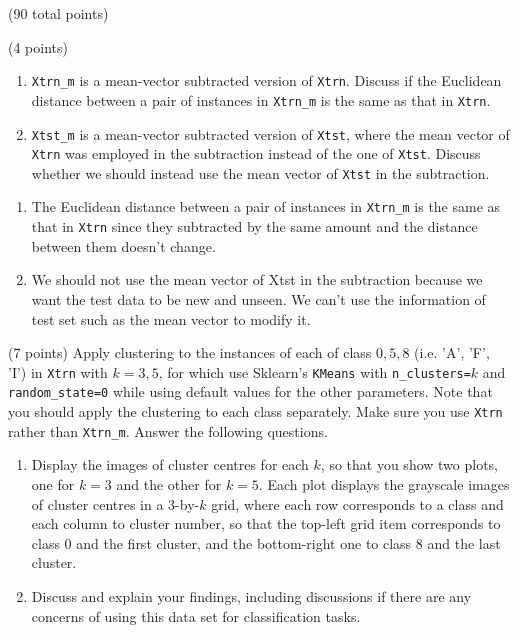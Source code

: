 \documentclass[12pt]{article}
\begin{document}
\begin{question}{(90 total points) \qTwoTitle}
\begin{subquestion}{(4 points)
  } \label{q2.2}
  \begin{enumerate}\NARROWITEM
  \item {\tt Xtrn\_m} is a mean-vector subtracted version of {\tt Xtrn}.
    Discuss if the Euclidean distance between a pair of instances in {\tt Xtrn\_m} is the same as that in {\tt Xtrn}.
  \item {\tt Xtst\_m} is a mean-vector subtracted version of {\tt Xtst}, where the mean vector of {\tt Xtrn} was employed in the subtraction instead of the one of {\tt Xtst}.
    Discuss whether we should instead use the mean vector of {\tt Xtst} in the subtraction.
  \end{enumerate}
   

  \begin{answerbox}{0.5\textheight}
    \begin{enumerate}
    \item The Euclidean distance between a pair of instances in {\tt Xtrn\_m} is the same as that in {\tt Xtrn} since they subtracted by the same amount and the distance between them doesn't change.
    \item We should not use the mean vector of Xtst in the subtraction because we want the test data to be new and unseen. We can't use the information of test set such as the mean vector to modify it.
    \end{enumerate}
  \end{answerbox}
  


\end{subquestion}

\begin{subquestion}{(7 points)
    Apply \kmeans clustering to the instances of each of class $0,5,8$ (i.e. 'A', 'F', 'I') in {\tt Xtrn} with $k = 3,5$, for which use Sklearn's {\tt KMeans} with {\tt n\_clusters=}$k$ and {\tt random\_state=0} while using default values for the other parameters. Note that you should apply the clustering to each class separately. Make sure you use {\tt Xtrn} rather than {\tt Xtrn\_m}.
    Answer the following questions.
  }
  \begin{enumerate}\NARROWITEM
  \item Display the images of cluster centres for each $k$, so that you show two plots, one for $k=3$  and the other for $k=5$. Each plot displays the grayscale images of cluster centres in a 3-by-$k$ grid, where each row corresponds to a class and each column to cluster number, so that the top-left grid item corresponds to class 0 and the first cluster, and the bottom-right one to class 8 and the last cluster.
  \item Discuss and explain your findings, including discussions if there are any concerns of using this data set for classification tasks.
  \end{enumerate}
   


\end{subquestion}
\end{question}
\end{document}
